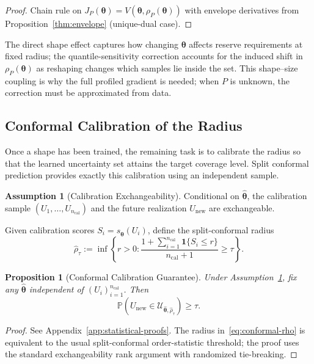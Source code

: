 \documentclass[11pt]{article}
\newcommand{\Prob}{\mathbb{P}}
\newcommand{\cU}{\mathcal{U}}
\newcommand{\btheta}{\bm{\theta}}
\newtheorem{proposition}[theorem]{Proposition}
\theoremstyle{definition}
\newtheorem{assumption}{Assumption}
\begin{document}
\begin{proof}
Chain rule on $J_P(\btheta)=V(\btheta,\rho_P(\btheta))$ with envelope derivatives from Proposition~\ref{thm:envelope} (unique-dual case).
\end{proof}

The direct shape effect captures how changing $\btheta$ affects reserve requirements at fixed radius; the quantile-sensitivity correction accounts for the induced shift in $\rho_P(\btheta)$ as reshaping changes which samples lie inside the set. This shape--size coupling is why the full profiled gradient is needed; when $P$ is unknown, the correction must be approximated from data.

\subsection{Conformal Calibration of the Radius}

Once a shape has been trained, the remaining task is to calibrate the radius so that the learned uncertainty set attains the target coverage level. Split conformal prediction provides exactly this calibration using an independent sample.

\begin{assumption}[Calibration Exchangeability]\label{asm:exchange}
Conditional on $\hat{\btheta}$, the calibration sample $(U_1,\ldots,U_{n_{\mathrm{cal}}})$ and the future realization $U_{\mathrm{new}}$ are exchangeable.
\end{assumption}

Given calibration scores $S_i = s_{\hat{\btheta}}(U_i)$, define the split-conformal radius
\begin{equation}\label{eq:conformal-rho}
\hat{\rho}_\tau := \inf\left\{ r>0 : \frac{1+\sum_{i=1}^{n_{\text{cal}}}\mathbf{1}\{S_i\le r\}}{n_{\text{cal}}+1} \ge \tau \right\}.
\end{equation}

\begin{proposition}[Conformal Calibration Guarantee]\label{thm:conformal}
Under Assumption~\ref{asm:exchange}, fix any $\hat{\btheta}$ independent of $(U_i)_{i=1}^{n_{\text{cal}}}$. Then
\[
\Prob(U_{\text{new}} \in \cU_{\hat{\btheta}, \hat{\rho}_\tau}) \geq \tau.
\]
\end{proposition}

\begin{proof}
See Appendix~\ref{app:statistical-proofs}. The radius in~\eqref{eq:conformal-rho} is equivalent to the usual split-conformal order-statistic threshold; the proof uses the standard exchangeability rank argument with randomized tie-breaking.
\end{proof}
\end{document}
